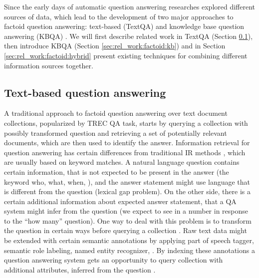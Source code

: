 Since the early days of automatic question answering researches explored different sources of data, which lead to the development of two major approaches to factoid question answering: text-based (TextQA) and knowledge base question answering (KBQA) \cite{Simmons:1965:AEQ:363707.363732}.
We will first describe related work in TextQA (Section \ref{sec:rel_work:factoid:text}), then introduce KBQA (Section \ref{sec:rel_work:factoid:kb}) and in Section \ref{sec:rel_work:factoid:hybrid} present existing techniques for combining different information sources together.

\subsection{Text-based question answering}
\label{sec:rel_work:factoid:text}

A traditional approach to factoid question answering over text document collections, popularized by TREC QA task, starts by querying a collection with possibly transformed question and retrieving a set of potentially relevant documents, which are then used to identify the answer.
Information retrieval for question answering has certain differences from traditional IR methods \cite{keikha2014retrieving}, which are usually based on keyword matches.
A natural language question contains certain information, that is not expected to be present in the answer (\eg the keyword who, what, when, \etc), and the answer statement might use language that is different from the question (lexical gap problem).
On the other side, there is a certain additional information about expected answer statement, that a QA system might infer from the question (\eg we expect to see in a number in response to the ``how many'' question).
One way to deal with this problem is to transform the question in certain ways before querying a collection \cite{AgichteinLG01,brill_askmsr}.
Raw text data might be extended with certain semantic annotations by applying part of speech tagger, semantic role labeling, named entity recognizer, \etc.
By indexing these annotations a question answering system gets an opportunity to query collection with additional attributes, inferred from the question \cite{bilotti2007structured,yao2013automatic}.

